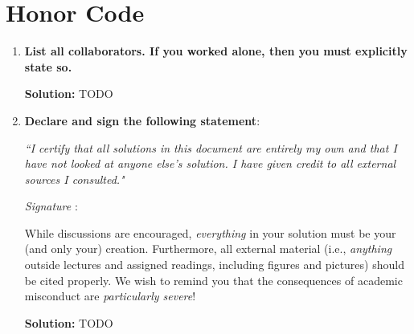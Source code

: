 \documentclass{article}
\newcommand{\Question}[1]{\Large \section{ #1 } \normalsize}
\newenvironment{solution}{\color{blue} \smallskip \textbf{Solution:}}{}
\begin{document}
\clearpage
\Question{Honor Code}
\begin{enumerate}
    \item 
    \textbf{List all collaborators. If you worked alone, then you must explicitly state so.}

    \begin{solution}
        TODO
    \end{solution}

    \item
    \textbf{Declare and sign the following statement}: 
    
    \textit{``I certify that all solutions in this document are entirely my own and that I have not looked at anyone else's solution. I have given credit to all external sources I consulted."}
    
    \textit{Signature} : \hrulefill
    
    While discussions are encouraged, \emph{everything} in your solution must be your (and only your) creation. 
    Furthermore, all external material  (i.e., \emph{anything} outside lectures and assigned
    readings, including figures and pictures) should be cited properly.
    We wish to remind you that the consequences of academic misconduct are \emph{particularly severe}!

    \begin{solution}
        TODO
    \end{solution}

\end{enumerate}
\end{document}
